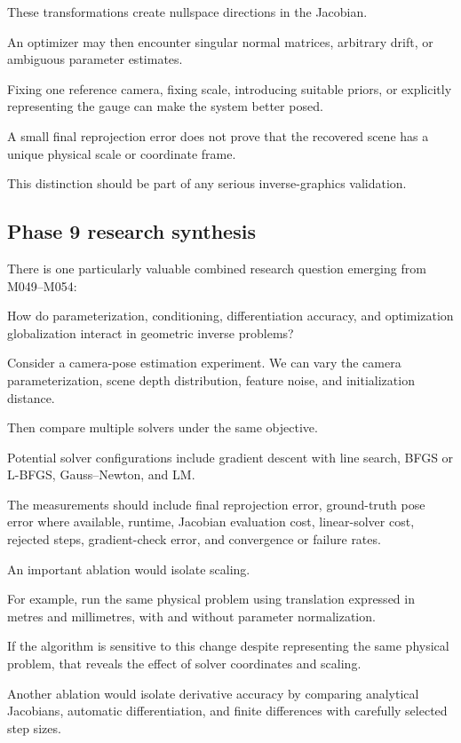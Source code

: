 These transformations create nullspace directions in the Jacobian.

An optimizer may then encounter singular normal matrices, arbitrary drift, or ambiguous parameter estimates.

Fixing one reference camera, fixing scale, introducing suitable priors, or explicitly representing the gauge can make the system better posed.

A small final reprojection error does not prove that the recovered scene has a unique physical scale or coordinate frame.

This distinction should be part of any serious inverse-graphics validation.

\subsection{Phase 9 research synthesis}\label{02-foundations-ii-ch028-phase-9-research-synthesis}

There is one particularly valuable combined research question emerging from M049--M054:

How do parameterization, conditioning, differentiation accuracy, and optimization globalization interact in geometric inverse problems?

Consider a camera-pose estimation experiment. We can vary the camera parameterization, scene depth distribution, feature noise, and initialization distance.

Then compare multiple solvers under the same objective.

Potential solver configurations include gradient descent with line search, BFGS or L-BFGS, Gauss--Newton, and LM.

The measurements should include final reprojection error, ground-truth pose error where available, runtime, Jacobian evaluation cost, linear-solver cost, rejected steps, gradient-check error, and convergence or failure rates.

An important ablation would isolate scaling.

For example, run the same physical problem using translation expressed in metres and millimetres, with and without parameter normalization.

If the algorithm is sensitive to this change despite representing the same physical problem, that reveals the effect of solver coordinates and scaling.

Another ablation would isolate derivative accuracy by comparing analytical Jacobians, automatic differentiation, and finite differences with carefully selected step sizes.

